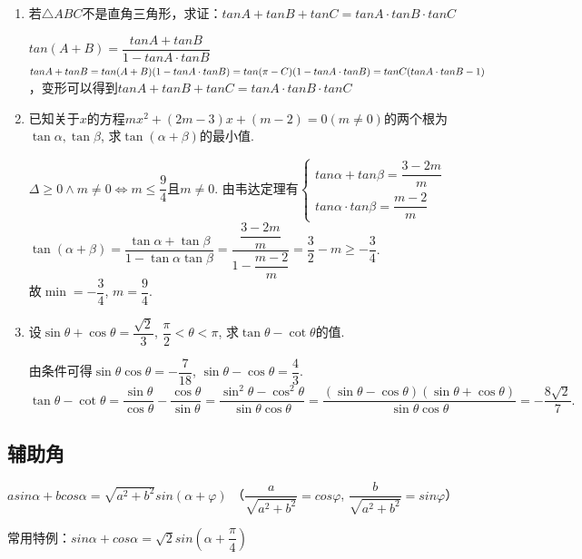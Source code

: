 \begin{enumerate}
    \item 若$\triangle ABC$不是直角三角形，求证：$tanA + tanB + tanC = tanA \cdot tanB \cdot tanC$
    \begin{jieda}
        $tan(A+B) = \dfrac{tanA + tanB}{1 - tanA \cdot tanB}$ \\
        $tanA + tanB = tan(A+B) (1 - tanA \cdot tanB) = tan(\pi-C) (1 - tanA \cdot tanB)\\ = tanC (tanA \cdot tanB - 1)$，变形可以得到$tanA + tanB + tanC = tanA \cdot tanB \cdot tanC$
    \end{jieda}
    \item 已知关于$x$的方程$mx^2+\left(2m-3\right)x+\left(m-2\right)=0\left(m\neq 0\right)$的两个根为$\tan\alpha,\tan\beta$, 求$\tan\left(\alpha+\beta\right)$的最小值.
    \begin{jieda}
    $\Delta\geq 0\land m\neq 0\iff m\leq\dfrac{9}{4}$且$ m\neq 0$. 由韦达定理有$\left \{ \begin{array}{l}
             tan\alpha + tan\beta = \dfrac{3-2m}{m}  \\
             tan\alpha \cdot tan\beta = \dfrac{m-2}{m}
            \end{array}\right.$ \\
    $\tan\left(\alpha+\beta\right)=\dfrac{\tan\alpha+\tan\beta}{1-\tan\alpha\tan\beta}=\dfrac{\dfrac{3-2m}{m}}{1-\dfrac{m-2}{m}} = \dfrac{3}{2}-m\geq-\dfrac{3}{4}$. \\
    故$\min=-\dfrac{3}{4}$, $m=\dfrac{9}{4}$. 
    \end{jieda}
    
    \item 设$\sin\theta+\cos\theta=\dfrac{\sqrt{2}}{3}$, $\dfrac{\pi}{2}<\theta<\pi$, 求$\tan\theta-\cot\theta$的值. 
    \begin{jieda}
    由条件可得$\sin\theta\cos\theta=-\dfrac{7}{18}$, $\sin\theta-\cos\theta=\dfrac{4}{3}$. 
    $\tan\theta-\cot\theta  = \dfrac{\sin\theta}{\cos\theta}-\dfrac{\cos\theta}{\sin\theta}
     = \dfrac{\sin^2\theta-\cos^2\theta}{\sin\theta\cos\theta}
     = \dfrac{(\sin\theta-\cos\theta)(\sin\theta+\cos\theta)}{\sin\theta\cos\theta}
     = -\dfrac{8\sqrt{2}}{7}.$
    \end{jieda}
\end{enumerate}

\subsection*{辅助角}
$asin\alpha + bcos\alpha = \sqrt{a^2+b^2} sin(\alpha + \varphi)$ （$\dfrac{a}{\sqrt{a^2+b^2}} = cos\varphi$, $\dfrac{b}{\sqrt{a^2+b^2}} = sin\varphi$）
\par 常用特例：$sin\alpha + cos\alpha = \sqrt{2} sin\left(\alpha + \dfrac{\pi}{4}\right)$

